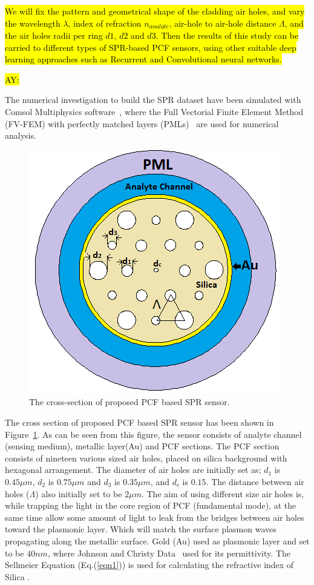 \documentclass[10pt]{IEEEtran}
\begin{document}
\hl{We will fix the pattern and geometrical shape of the cladding air holes, and vary the wavelength $\lambda$, index of refraction $n_{analyte} $, air-hole to air-hole distance $ \Lambda $, and the air holes radii per ring $d1$, $d2$ and $d3$. Then the results of this study can be carried to different types of SPR-based PCF sensors, using other suitable deep learning approaches such as Recurrent and Convolutional neural networks. }

\hl{AY:}

The numerical investigation to build the SPR dataset have been simulated with Comsol Multiphysics software~\cite{comsol_help}, where  the Full Vectorial Finite Element Method (FV-FEM) with perfectly matched layers (PMLs)~\cite{koshiba2002full,saitoh2001full} are used for numerical analysis. 

\begin{figure}[]
	\centering
	\includegraphics[width=.6\linewidth]{figures/Figx}
	\caption{The cross-section of proposed  PCF based SPR sensor.}
	\label{Figx}
\end{figure}



The cross section of proposed PCF based SPR sensor has been shown in Figure~\ref{Figx}. As can be seen from this figure, the sensor consists of analyte channel (sensing medium), metallic layer(Au) and PCF sections. The PCF section consists of nineteen various sized air holes, placed on silica background with hexagonal arrangement.  The diameter of air holes are initially set as; $d_1$ is $0.45 \mu m$, $d_2$ is $0.75 \mu m$ and $d_3$ is $0.35 \mu m$, and  $d_c$ is $0.15$. The distance between air holes ($\Lambda$) also initially  set to be $2 \mu m$. The aim of using different size air holes is, while trapping the light in the core region of PCF (fundamental mode), at the same time allow some amount of light to leak from the bridges between air holes toward the plasmonic layer. Which will match the surface plasmon waves propagating along the metallic surface. Gold (Au) used as plasmonic layer and set to be $40 nm$, where Johnson and Christy Data~\cite{johnson1972optical} used for its permittivity. The Sellmeier Equation (Eq.(\ref{eqn1})) is used for calculating the refractive index of Silica  \cite{bjarklev2003PCF}.
\end{document}
